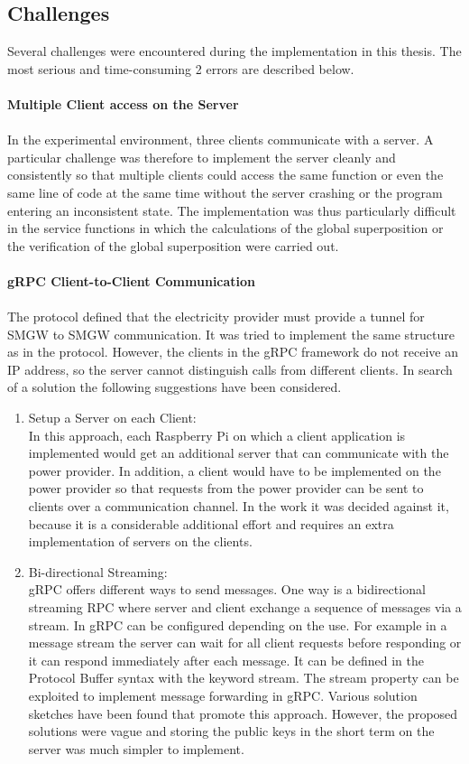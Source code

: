 \subsection{Challenges}
Several challenges were encountered during the implementation in this thesis. The most serious and time-consuming 2 errors are described below.\\
\\
\textbf{Multiple Client access on the Server}
\\
\\ 
In the experimental environment, three clients communicate with a server. A particular challenge was therefore to implement the server cleanly and consistently so that multiple clients could access the same function or even the same line of code at the same time without the server crashing or the program entering an inconsistent state. The implementation was thus particularly difficult in the service functions in which the calculations of the global superposition or the verification of the global superposition were carried out.%
\\
\\
\textbf{gRPC Client-to-Client Communication}
\\
\\
The protocol defined that the electricity provider must provide a tunnel for \gls{SMGW} to \gls{SMGW} communication. It was tried to implement the same structure as in the protocol. However, the clients in the gRPC framework do not receive an \gls{IP} address, so the server cannot distinguish calls from different clients. In search of a solution the following suggestions have been considered. 
\begin{enumerate}
\item Setup a Server on each Client:\\
In this approach, each Raspberry Pi on which a client application is implemented would get an additional server that can communicate with the power provider. In addition, a client would have to be implemented on the power provider so that requests from the power provider can be sent to clients over a communication channel. In the work it was decided against it, because it is a considerable additional effort and requires an extra implementation of servers on the clients.
\item Bi-directional Streaming:\\
gRPC offers different ways to send messages. One way is a bidirectional streaming \gls{RPC} where server and client exchange a sequence of messages via a stream. In gRPC can be configured depending on the use.
For example in a message stream the server can wait for all client requests before responding or it can respond immediately after each message. It can be defined in the Protocol Buffer syntax with the keyword stream. The stream property can be exploited to implement message forwarding in gRPC. Various solution sketches have been found that promote this approach. However, the proposed solutions were vague and storing the public keys in the short term on the server was much simpler to implement. 
\end{enumerate}\\
